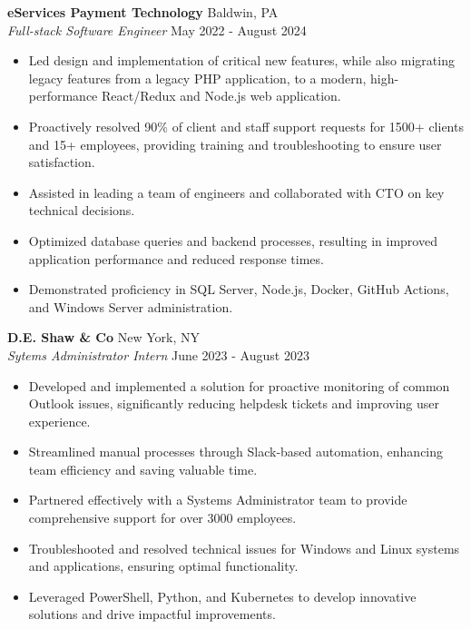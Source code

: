 \documentclass[letterpaper]{article}
\begin{document}
\textbf{eServices Payment Technology} \hfill Baldwin, PA\\
\textit{Full-stack Software Engineer} \hfill May 2022 - August 2024\\
\vspace{-1mm}
\begin{itemize} \itemsep -1pt
    \item Led design and implementation of critical new features, while also migrating legacy features from a legacy PHP application, to a modern, high-performance React/Redux and Node.js web application.
    \item Proactively resolved 90\% of client and staff support requests for 1500+ clients and 15+ employees, providing training and troubleshooting to ensure user satisfaction.
    \item Assisted in leading a team of engineers and collaborated with CTO on key technical decisions.
    \item Optimized database queries and backend processes, resulting in improved application performance and reduced response times.
    \item Demonstrated proficiency in SQL Server, Node.js, Docker, GitHub Actions, and Windows Server administration.
\end{itemize}
\vspace{-1mm}
\textbf{D.E. Shaw \& Co} \hfill New York, NY\\
\textit{Sytems Administrator Intern} \hfill June 2023 - August 2023\\
\vspace{-1mm}
\begin{itemize} \itemsep -1pt
	\item Developed and implemented a solution for proactive monitoring of common Outlook issues, significantly reducing helpdesk tickets and improving user experience.
	\item Streamlined manual processes through Slack-based automation, enhancing team efficiency and saving valuable time.
	\item Partnered effectively with a Systems Administrator team to provide comprehensive support for over 3000 employees.
	\item Troubleshooted and resolved technical issues for Windows and Linux systems and applications, ensuring optimal functionality.
	\item Leveraged PowerShell, Python, and Kubernetes to develop innovative solutions and drive impactful improvements.
\end{itemize}
\end{document}
